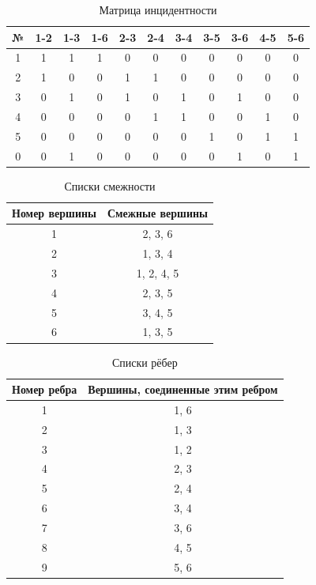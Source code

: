\begin{table}[!ht]
    \centering
    \caption{Матрица инцидентности}
    \begin{tabular}{|c|c|c|c|c|c|c|c|c|c|c|}
    \hline
        № & 1-2 & 1-3 & 1-6 & 2-3 & 2-4 & 3-4 & 3-5 & 3-6 & 4-5 & 5-6 \\ \hline
        1 & 1 & 1 & 1 & 0 & 0 & 0 & 0 & 0 & 0 & 0 \\ \hline
        2 & 1 & 0 & 0 & 1 & 1 & 0 & 0 & 0 & 0 & 0 \\ \hline
        3 & 0 & 1 & 0 & 1 & 0 & 1 & 0 & 1 & 0 & 0 \\ \hline
        4 & 0 & 0 & 0 & 0 & 1 & 1 & 0 & 0 & 1 & 0 \\ \hline
        5 & 0 & 0 & 0 & 0 & 0 & 0 & 1 & 0 & 1 & 1 \\ \hline
        0 & 0 & 1 & 0 & 0 & 0 & 0 & 0 & 1 & 0 & 1 \\ \hline
    \end{tabular}
    \label{Матрица инцидентности}
\end{table}



\begin{table}[!ht]
    \centering
    \caption{Списки смежности}
    \begin{tabular}{|c|c|}
    \hline
        Номер вершины & Смежные вершины \\ \hline
        1 & 2, 3, 6 \\ \hline
        2 & 1, 3, 4 \\ \hline
        3 & 1, 2, 4, 5 \\ \hline
        4 & 2, 3, 5 \\ \hline
        5 & 3, 4, 5 \\ \hline
        6 & 1, 3, 5 \\ \hline
    \end{tabular}
    \label{Списки смежности}
\end{table}



\begin{table}[!ht]
    \centering
    \caption{Списки рёбер}
    \begin{tabular}{|c|c|}
    \hline
        Номер ребра & Вершины, соединенные этим ребром \\ \hline
        1 & 1, 6 \\ \hline
        2 & 1, 3 \\ \hline
        3 & 1, 2 \\ \hline
        4 & 2, 3 \\ \hline
        5 & 2, 4 \\ \hline
        6 & 3, 4 \\ \hline
        7 & 3, 6 \\ \hline
        8 & 4, 5 \\ \hline
        9 & 5, 6 \\ \hline
    \end{tabular}
    \label{Списки рёбер}
\end{table}



